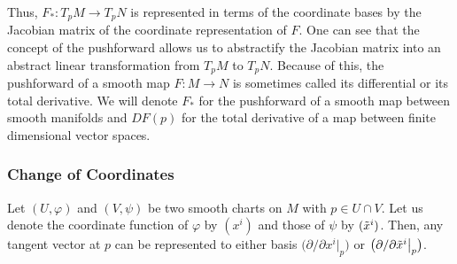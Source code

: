 \documentclass{article}
\theoremstyle{remark}
\theoremstyle{definition}
\begin{document}
Thus, $F_*: T_p M \longrightarrow T_p N$ is represented in terms of the coordinate bases by the Jacobian matrix of the coordinate representation of $F$. One can see that the concept of the pushforward allows us to abstractify the Jacobian matrix into an abstract linear transformation from $T_p M$ to $T_p N$. Because of this, the pushforward of a smooth map $F: M \longrightarrow N$ is sometimes called its differential or its total derivative. We will denote $F_*$ for the pushforward of a smooth map between smooth manifolds and $DF(p)$ for the total derivative of a map between finite dimensional vector spaces. 

\subsubsection{Change of Coordinates}
Let $(U, \varphi)$ and $(V, \psi)$ be two smooth charts on $M$ with $p \in U \cap V$. Let us denote the coordinate function of $\varphi$ by $(x^i)$ and those of $\psi$ by $( \Tilde{x}^i)$. Then, any tangent vector at $p$ can be represented to either basis $ \big( \partial/\partial x^i \big|_p \big)$ or $\big( \partial/\partial \Tilde{x}^i \big|_p \big)$. 
\end{document}
